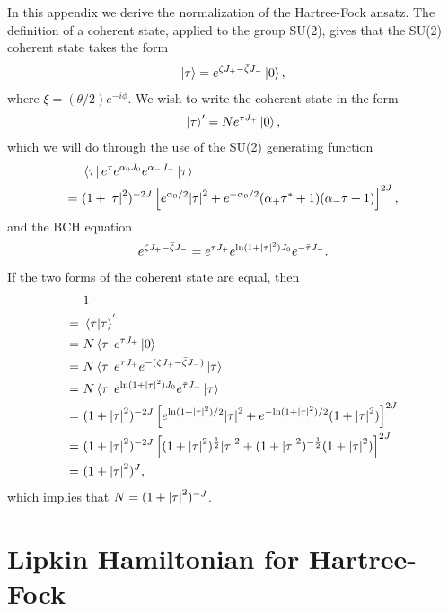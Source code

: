 \documentclass[Dual]{msu-thesis}
\begin{document}
\begin{appendices}
In this appendix we derive the normalization of the Hartree-Fock ansatz.
The definition of a coherent state, applied to the group SU(2), gives that the SU(2) coherent state takes the form
\begin{align}
\ket{\tau}=e^{\zeta J_+-\bar{\zeta}J_-}\ket{0},
\end{align}
where $\xi=(\theta/2)e^{-i\phi}$. We wish to write the coherent state in the form
\begin{align}
\ket{\tau}'=Ne^{\tau J_+}\ket{0},
\end{align}
which we will do through the use of the SU(2) generating function
\begin{align}
\label{gf}
&\bra{\tau}e^{\tau}e^{\alpha_0J_0}e^{\alpha_-J_-}\ket{\tau}
\\
= \ &
(1+\abs{\tau}^2)^{-2J}\left[e^{\alpha_0/2}\abs{\tau}^2+e^{-\alpha_0/2}(\alpha_+\tau^*+1)(\alpha_-\tau+1)\right]^{2J},
\end{align}
and the BCH equation
\begin{align}
e^{\zeta J_+-\bar{\zeta}J_-}
=
e^{\tau J_+}e^{\text{ln}(1+\abs{\tau}^2)J_0}e^{-\bar{\tau}J_-}.
\end{align}
If the two forms of the coherent state are equal, then
\begin{align}
&1
\\
= \ &\bra{\tau}\ket{\tau}^{'}
\\
= \ &
N\bra{\tau}e^{\tau J_+}\ket{0}
\\
= \ &
N\bra{\tau}e^{\tau J_+}e^{-(\zeta J_+-\bar{\zeta}J_-)}\ket{\tau}
\\
= \ &
N\bra{\tau}e^{\text{ln}(1+\abs{\tau}^2)J_0}e^{\bar{\tau}J_-}\ket{\tau}
\\
= \ &
(1+\abs{\tau}^2)^{-2J}\left[e^{\text{ln}(1+\abs{\tau}^2)/2}\abs{\tau}^2+e^{-\text{ln}(1+\abs{\tau}^2)/2}(1+\abs{\tau}^2)\right]^{2J}
\\
= \ &
(1+\abs{\tau}^2)^{-2J}\left[(1+\abs{\tau}^2)^{\frac{1}{2}}\abs{\tau}^2+(1+\abs{\tau}^2)^{-\frac{1}{2}}(1+\abs{\tau}^2)\right]^{2J}
\\
= \ &
(1+\abs{\tau}^2)^J,
\end{align}
which implies that $N=(1+\abs{\tau}^2)^{-J}$.

\chapter{Lipkin Hamiltonian for Hartree-Fock}
\label{appendix:lipkin_hamiltonian_matrix_elements_for_hf}


\end{appendices}
\end{document}
